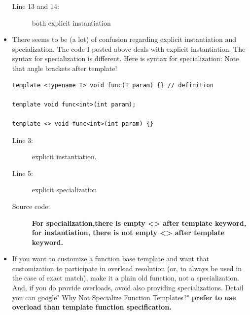 \documentclass[a4paper,11pt,twoside]{book}
\begin{document}
\begin{itemize}
\begin{description}
	\item[Line 13 and 14:] both explicit instantiation
\end{description}

\item There seems to be (a lot) of confusion regarding explicit instantiation and specialization. The code I posted above deals with explicit instantiation. The syntax for specialization is different. Here is syntax for specialization: Note that angle brackets after template!

\begin{lstlisting}
template <typename T> void func(T param) {} // definition

template void func<int>(int param); 

template <> void func<int>(int param) {} 
\end{lstlisting}
\begin{description}
	\item[Line 3:] explicit instantiation.
	\item[Line 5:] explicit specialization
	\item[Source code:]\textbf{For specialization,there is empty <> after template keyword, for instantiation, there is not empty <> after template keyword.}
\end{description}

	\item  If you want to customize a function base template and want that customization to participate in overload resolution (or, to always be used in the case of exact match), make it a plain old function, not a specialization. And, if you do provide overloads, avoid also providing specializations. Detail you can google" Why Not Specialize Function Templates?" \textbf{prefer to use overload than template function specification.}

\end{itemize}
\end{document}
